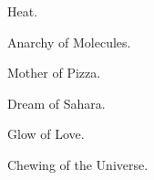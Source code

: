 \documentclass{article}
\begin{document}
\newline

Heat. \newline

Anarchy of Molecules. \newline

Mother of Pizza. \newline

Dream of Sahara. \newline

Glow of Love. \newline

Chewing of the Universe. \newline
\end{document}
